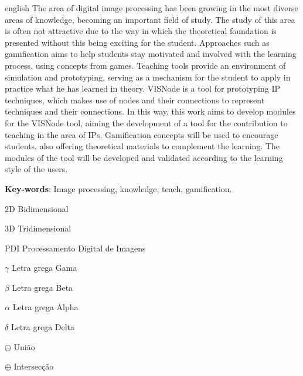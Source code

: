 \documentclass[
	12pt,				%
	oneside,			%
	a4paper,			%
	english,			%
	french,				%
	spanish,			%
	brazil,				%
	]{abntex2}
\begin{document}
\begin{resumo}[ABSTRACT]
 \begin{otherlanguage*}{english}
The area of digital image processing has been growing in the most diverse areas of knowledge, becoming an important field of study. The study of this area is often not attractive due to the way in which the theoretical foundation is presented without this being exciting for the student. Approaches such as gamification aims to help students stay motivated and involved with the learning process, using concepts from games. Teaching tools provide an environment of simulation and prototyping, serving as a mechanism for the student to apply in practice what he has learned in theory. VISNode is a tool for prototyping IP techniques, which makes use of nodes and their connections to represent techniques and their connections. In this way, this work aims to develop modules for the VISNode tool, aiming the development of a tool for the contribution to teaching in the area of IPs. Gamification concepts will be used to encourage students, also offering theoretical materials to complement the learning. The modules of the tool will be developed and validated according to the learning style of the users.

   \vspace{\onelineskip}
 
   \noindent 
   \textbf{Key-words}: Image processing, knowledge, teach, gamification.
 \end{otherlanguage*}
\end{resumo}


\listoffigures*
\cleardoublepage

\listoftables*
\cleardoublepage

\begin{siglas}
  \item[2D] Bidimensional
  \item[3D] Tridimensional
  \item[PDI] Processamento Digital de Imagens
\end{siglas}

\begin{simbolos}
  \item[$ \gamma $] Letra grega Gama
  \item[$ \beta $] Letra grega Beta
  \item[$ \alpha $] Letra grega Alpha
  \item[$ \delta $] Letra grega Delta
  \item[$ \ominus $] União
  \item[$ \oplus $] Intersecção
  
\end{simbolos}
\end{document}
